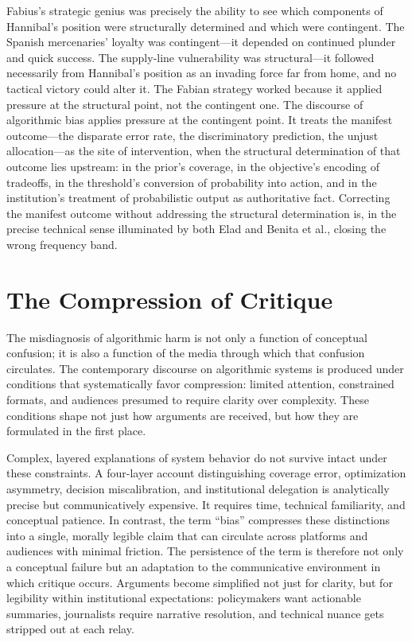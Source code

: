 \documentclass[12pt, a4paper]{article}
\begin{document}
Fabius's strategic genius was precisely the ability to see which components of Hannibal's position were structurally determined and which were contingent. The Spanish mercenaries' loyalty was contingent---it depended on continued plunder and quick success. The supply-line vulnerability was structural---it followed necessarily from Hannibal's position as an invading force far from home, and no tactical victory could alter it. The Fabian strategy worked because it applied pressure at the structural point, not the contingent one. The discourse of algorithmic bias applies pressure at the contingent point. It treats the manifest outcome---the disparate error rate, the discriminatory prediction, the unjust allocation---as the site of intervention, when the structural determination of that outcome lies upstream: in the prior's coverage, in the objective's encoding of tradeoffs, in the threshold's conversion of probability into action, and in the institution's treatment of probabilistic output as authoritative fact. Correcting the manifest outcome without addressing the structural determination is, in the precise technical sense illuminated by both Elad and Benita et al., closing the wrong frequency band.

\section{The Compression of Critique}

The misdiagnosis of algorithmic harm is not only a function of conceptual confusion; it is also a function of the media through which that confusion circulates. The contemporary discourse on algorithmic systems is produced under conditions that systematically favor compression: limited attention, constrained formats, and audiences presumed to require clarity over complexity. These conditions shape not just how arguments are received, but how they are formulated in the first place.

Complex, layered explanations of system behavior do not survive intact under these constraints. A four-layer account distinguishing coverage error, optimization asymmetry, decision miscalibration, and institutional delegation is analytically precise but communicatively expensive. It requires time, technical familiarity, and conceptual patience. In contrast, the term \enquote{bias} compresses these distinctions into a single, morally legible claim that can circulate across platforms and audiences with minimal friction. The persistence of the term is therefore not only a conceptual failure but an adaptation to the communicative environment in which critique occurs. Arguments become simplified not just for clarity, but for legibility within institutional expectations: policymakers want actionable summaries, journalists require narrative resolution, and technical nuance gets stripped out at each relay.
\end{document}

